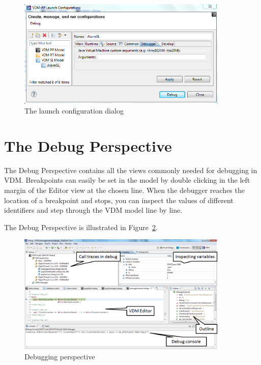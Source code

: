 \documentclass{overturerepchap}
\begin{document}
\begin{figure}[htp]
\begin{center}
  \includegraphics[width=380px]{screenDumps/launchconfigSpecialoptions}
  \caption{The launch configuration dialog}
  \label{fig:userguide:launchconfigSpecialoptions}
\end{center}
\end{figure}

\section{The Debug Perspective}

The Debug Perspective contains all the views
commonly needed for debugging in VDM. Breakpoints can easily be set in the
model by double clicking in the left margin of the Editor view at the chosen
line. When the debugger reaches the location of a breakpoint and stops, you can
inspect the values of different identifiers and step through the VDM model
line by line.

The Debug Perspective is illustrated in Figure~\ref{fig:userguide:DebuggingVDM}.

\begin{figure}[htp]
\begin{center}
  \includegraphics[width=380px]{figures/DebuggingVDM}
  \caption[Debugging perspective]{Debugging perspective}
  \label{fig:userguide:DebuggingVDM}
\end{center}
\end{figure}
\end{document}
